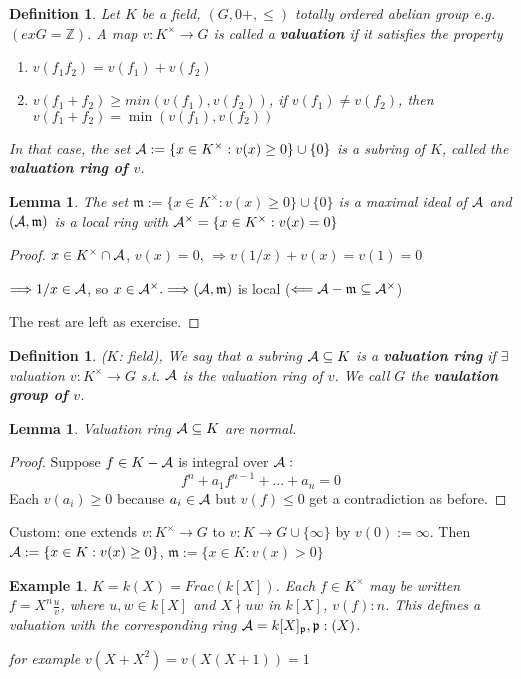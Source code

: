\documentclass[11pt]{article}
\newtheorem{lemma}[thm]{Lemma}
\newtheorem{dfn}[thm]{Definition}
\newtheorem{ex}[thm]{Example}
\newcommand{\intg}{\mathbb Z}
\newcommand{\scm}{{\mathfrak m}}
\newcommand{\scp}{{\mathfrak p}}
\newcommand{\cala}{{\cal A}}
\newcommand{\Lrta}{\Longrightarrow}
\newcommand{\lrta}{\longrightarrow}
\newcommand{\Llta}{\Longleftarrow}
\begin{document}
\begin{dfn}
Let $K$ be a field, $(G,0+,\leq)$ totally ordered abelian group e.g. $(ex G=\intg)$. A map $v:K^\times\lrta G$ is called a \textbf{valuation} if it satisfies the property
\begin{enumerate}
\item 
$
v(f_1f_2)=v(f_1)+v(f_2)
$
\item $v(f_1+f_2)\geq min(v(f_1),v(f_2))$, if $v(f_1)\neq v(f_2)$, then $v(f_1+f_2)=\min (v(f_1),v(f_2))$
\end{enumerate}
In that case, the set $\cala:=\{x\in K^\times:v(x)\geq 0\}\cup \{0\}$ is a subring of $K$, called the \textbf{valuation ring of $v$}.
\end{dfn}
\begin{lemma}
The set $\scm:=\{x\in K^\times:v(x)\geq 0\}\cup \{0\}$ is a maximal ideal of $\cala$ and $(\cala,\scm)$ is a local ring with $\cala^\times=\{x\in K^\times:v(x)=0\}$
\end{lemma}
\begin{proof}
$x\in K^\times \cap \cala$, $v(x)=0$, $\Lrta v(1/x)+v(x)=v(1)=0$

$\Lrta 1/x\in \cala$, so $x\in \cala^\times.\Lrta (\cala,\scm)$ is local ($\Llta \cala-\scm\subseteq\cala^\times$)

The rest are left as exercise.
\end{proof}


\begin{dfn}
($K$: field), We say that a subring $\cala\subseteq K$ is a \textbf{valuation ring} if $\exists $ valuation $v:K^\times\lrta G$ s.t. $\cala$ is the valuation ring of $v$. We call $G$ the \textbf{vaulation group of $v$}.
\end{dfn}

\begin{lemma}
Valuation ring $\cala\subseteq K$  are normal. 
\end{lemma}
\begin{proof}
Suppose $f\in K-\cala$ is integral over $\cala:$
$$
f^n+a_1 f^{n-1}+...+a_n=0
$$
Each $v(a_i)\geq 0$ because $a_i\in \cala$ but $v(f)\leq 0$ get a contradiction as before.
\end{proof}

Custom: one extends $v: K^\times\lrta G$ to $v: K\lrta G\cup \{\infty\}$ by $v(0):=\infty$.
Then $\cala:=\{x\in K:v(x)\geq 0\}$, $\scm:=\{x\in K:v(x)>0\}$

\begin{ex}
$K=k(X)=Frac(k[X])$. Each $f\in K^\times$ may be written $f=X^n\frac{u}{v}$, where $u,w\in k[X]$ and $X\nmid uw$ in $k[X]$, $v(f):n$. This defines a valuation with the corresponding ring 
$\cala=k[X]_\scp,\scp:(X)$. 

for example
$v(X+X^2)=v(X(X+1))=1$
\end{ex}
\end{document}
